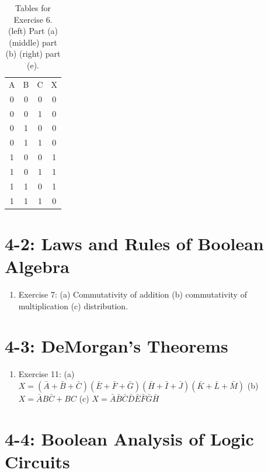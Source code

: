 \documentclass[10pt]{article}
\begin{document}
\begin{enumerate}
\begin{table}[ht]
\begin{tabular}{| c | c | c | c |}
\hline
A & B & C & X \\
0 & 0 & 0 & 0 \\
0 & 0 & 1 & 0 \\
0 & 1 & 0 & 0 \\
0 & 1 & 1 & 0 \\
1 & 0 & 0 & 1 \\
1 & 0 & 1 & 1 \\
1 & 1 & 0 & 1 \\
1 & 1 & 1 & 0 \\
\hline
\end{tabular}
\caption{\label{tab:ex6} Tables for Exercise 6. (left) Part (a) (middle) part (b) (right) part (e).}
\end{table}
\end{enumerate}

\section{4-2: Laws and Rules of Boolean Algebra}

\begin{enumerate}
\item Exercise 7: (a) Commutativity of addition (b) commutativity of multiplication (c) distribution. 
\end{enumerate}

\section{4-3: DeMorgan's Theorems}

\begin{enumerate}
\item Exercise 11: (a) $X = (\bar{A}+\bar{B}+\bar{C})(\bar{E}+\bar{F}+\bar{G})(\bar{H}+\bar{I}+\bar{J})(\bar{K}+\bar{L}+\bar{M})$ (b) $X = \bar{A}B\bar{C} + BC$ (c) $X = \bar{A}\bar{B}\bar{C}\bar{D}\bar{E}\bar{F}\bar{G}\bar{H}$ 
\end{enumerate}

\section{4-4: Boolean Analysis of Logic Circuits}
\end{document}
